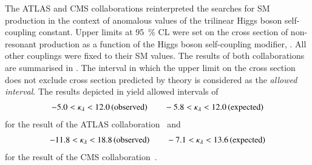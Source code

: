 The ATLAS and CMS collaborations reinterpreted the searches for SM \HH
production in the context of anomalous values of the trilinear Higgs boson
self-coupling constant. Upper limits at \SI{95}{\percent} CL were set on the
cross section of non-resonant \HH production as a function of the Higgs boson
self-coupling modifier, \klambda. All other couplings were fixed to their SM
values. The results of both collaborations are summarised in
. The \klambda interval in which the upper limit
on the cross section does not exclude cross section predicted by theory is
considered as the \emph{allowed \klambda interval}. The results depicted in
 yield allowed \klambda intervals of
\begin{align*}
  -5.0 < \kappa_{\lambda} < 12.0 \,\text{(observed)} \qquad -5.8 < \kappa_{\lambda} < 12.0 \,\text{(expected)}
\end{align*}
for the result of the ATLAS collaboration~\cite{HDBS-2018-58} and
\begin{align*}
  -11.8 < \kappa_{\lambda} < 18.8 \,\text{(observed)} \qquad -7.1 < \kappa_{\lambda} < 13.6 \,\text{(expected)}
\end{align*}
for the result of the CMS collaboration~\cite{CMS-HIG-17-030}.

